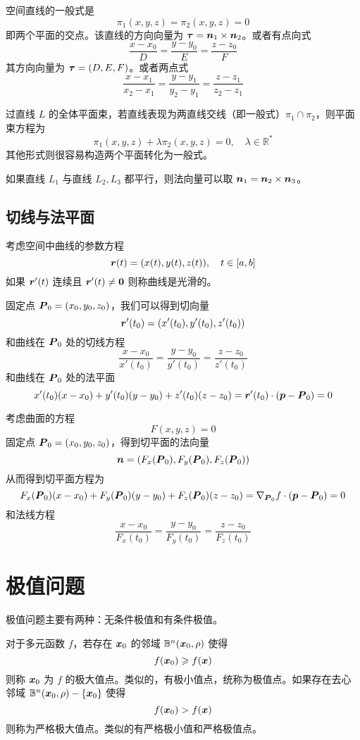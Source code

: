 空间直线的一般式是
\[ \pi_1(x, y, z) = \pi_2(x, y, z) = 0 \]
即两个平面的交点。该直线的方向向量为 $\boldsymbol{\tau} = \boldsymbol{n}_1 \times \boldsymbol{n}_2$。或者有点向式
\[ \frac{x - x_0}{D} = \frac{y - y_0}{E} = \frac{z - z_0}{F} \]
其方向向量为 $\boldsymbol{\tau} = (D, E, F)$。或者两点式
\[ \frac{x - x_1}{x_2 - x_1} = \frac{y - y_1}{y_2 - y_1} = \frac{z - z_1}{z_2 - z_1} \]

过直线 $L$ 的全体平面束，若直线表现为两直线交线（即一般式）$\pi_1 \cap \pi_2$，则平面束方程为
\[ \pi_1(x, y, z) + \lambda \pi_2(x, y, z) = 0, \quad \lambda \in \mathbb{R}^\ast \]
其他形式则很容易构造两个平面转化为一般式。

如果直线 $L_1$ 与直线 $L_2, L_3$ 都平行，则法向量可以取 $\boldsymbol{n}_1 = \boldsymbol{n}_2 \times \boldsymbol{n}_3$。

\subsection{切线与法平面}

考虑空间中曲线的参数方程
\[ \boldsymbol{r}(t) = (x(t), y(t), z(t)), \quad t \in [a, b] \]
如果 $\boldsymbol{r}'(t)$ 连续且 $\boldsymbol{r}'(t) \neq \boldsymbol{0}$ 则称曲线是光滑的。

固定点 $\boldsymbol{P}_0 = (x_0, y_0, z_0)$，我们可以得到切向量
\[ \boldsymbol{r}'(t_0) = (x'(t_0), y'(t_0), z'(t_0)) \]
和曲线在 $\boldsymbol{P}_0$ 处的切线方程
\[ \frac{x - x_0}{x'(t_0)} = \frac{y - y_0}{y'(t_0)} = \frac{z - z_0}{z'(t_0)} \]
和曲线在 $\boldsymbol{P}_0$ 处的法平面
\[ x'(t_0)(x - x_0) + y'(t_0)(y - y_0) + z'(t_0)(z - z_0) = \boldsymbol{r}'(t_0) \cdot (\boldsymbol{p} - \boldsymbol{P}_0) = 0 \]

考虑曲面的方程
\[ F(x, y, z) = 0 \]
固定点 $\boldsymbol{P}_0 = (x_0, y_0, z_0)$，得到切平面的法向量
\[ \boldsymbol{n} = (F_x(\boldsymbol{P}_0), F_y(\boldsymbol{P}_0), F_z(\boldsymbol{P}_0)) \]
从而得到切平面方程为
\[ F_x(\boldsymbol{P}_0)(x-x_0) + F_y(\boldsymbol{P}_0)(y-y_0) + F_z(\boldsymbol{P}_0)(z-z_0) = \nabla_{\boldsymbol{P}_0}f \cdot (\boldsymbol{p} - \boldsymbol{P}_0) = 0 \]
和法线方程
\[ \frac{x - x_0}{F_x(t_0)} = \frac{y - y_0}{F_y(t_0)} = \frac{z - z_0}{F_z(t_0)} \]

\section{极值问题}

极值问题主要有两种：无条件极值和有条件极值。

对于多元函数 $f$，若存在 $\boldsymbol{x}_0$ 的邻域 $\mathbb{B}^n(\boldsymbol{x}_0, \rho)$ 使得
\[ f(\boldsymbol{x}_0) \geqslant f(\boldsymbol{x}) \]
则称 $\boldsymbol{x}_0$ 为 $f$ 的极大值点。类似的，有极小值点，统称为极值点。如果存在去心邻域 $\mathbb{B}^n(\boldsymbol{x}_0, \rho) - \{\boldsymbol{x}_0\}$ 使得
\[ f(\boldsymbol{x}_0) > f(\boldsymbol{x}) \]
则称为严格极大值点。类似的有严格极小值和严格极值点。

